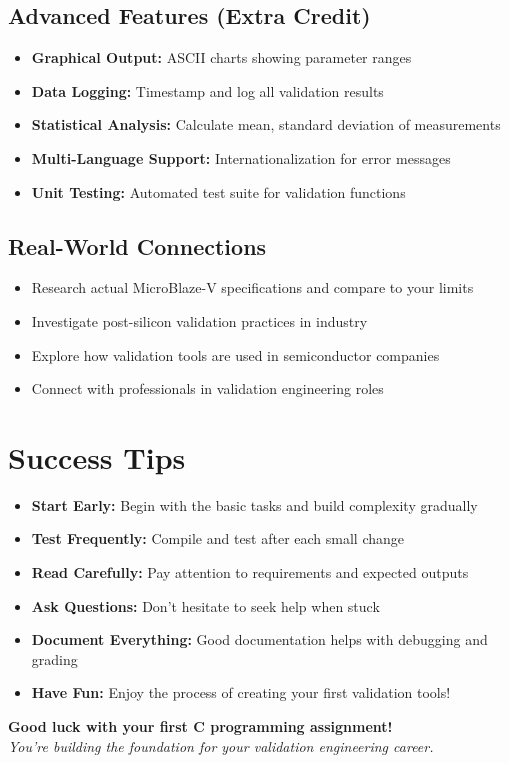 \documentclass[11pt,a4paper]{article}
\begin{document}
\subsection{Advanced Features (Extra Credit)}
\begin{itemize}
    \item \textbf{Graphical Output:} ASCII charts showing parameter ranges
    \item \textbf{Data Logging:} Timestamp and log all validation results
    \item \textbf{Statistical Analysis:} Calculate mean, standard deviation of measurements
    \item \textbf{Multi-Language Support:} Internationalization for error messages
    \item \textbf{Unit Testing:} Automated test suite for validation functions
\end{itemize}

\subsection{Real-World Connections}
\begin{itemize}
    \item Research actual MicroBlaze-V specifications and compare to your limits
    \item Investigate post-silicon validation practices in industry
    \item Explore how validation tools are used in semiconductor companies
    \item Connect with professionals in validation engineering roles
\end{itemize}

\section{Success Tips}

\begin{itemize}
    \item \textbf{Start Early:} Begin with the basic tasks and build complexity gradually
    \item \textbf{Test Frequently:} Compile and test after each small change
    \item \textbf{Read Carefully:} Pay attention to requirements and expected outputs
    \item \textbf{Ask Questions:} Don't hesitate to seek help when stuck
    \item \textbf{Document Everything:} Good documentation helps with debugging and grading
    \item \textbf{Have Fun:} Enjoy the process of creating your first validation tools!
\end{itemize}

\vspace{1cm}

\begin{center}
\textbf{Good luck with your first C programming assignment!}\\
\textit{You're building the foundation for your validation engineering career.}
\end{center}
\end{document}
